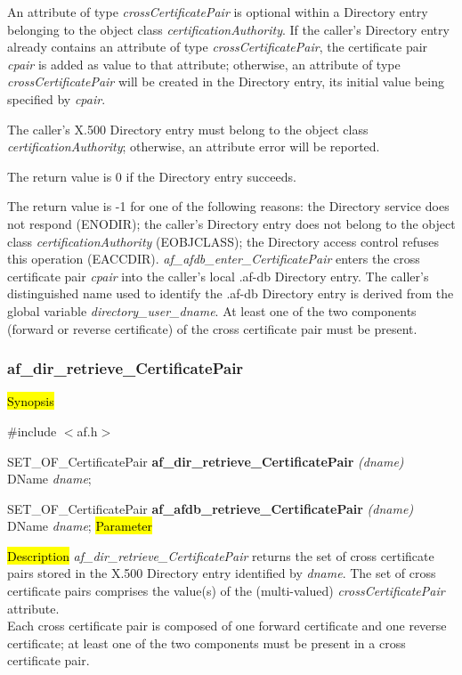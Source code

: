 An attribute of type {\em crossCertificatePair} is optional within a Directory entry
belonging to the object class {\em certificationAuthority}. If the caller's Directory entry
already contains an attribute of
type {\em crossCertificatePair}, the certificate pair {\em cpair} is added as value
to that attribute; otherwise, an attribute of type {\em crossCertificatePair} will be
created in the Directory entry, its initial value being specified by {\em cpair}.

The caller's X.500 Directory entry must belong to the object class
{\em certificationAuthority}; otherwise, an attribute error will be reported.

The return value is 0 if the Directory entry succeeds.

The return value is -1 for one of the following reasons:
\bi
\m the Directory service does not respond (ENODIR);
\m the caller's Directory entry does not belong to the object class
{\em certificationAuthority} (EOBJCLASS);
\m the Directory access control refuses this operation (EACCDIR).
\ei
{\em af\_afdb\_enter\_CertificatePair} enters the cross certificate pair {\em cpair} 
into the caller's local .af-db Directory entry. The caller's distinguished name used to
identify the .af-db Directory entry is derived from
the global variable {\em directory\_user\_dname}. At least one of the two components 
(forward or reverse certificate) of the cross certificate pair must be present.



\subsubsection{af\_dir\_retrieve\_CertificatePair}

\hl{Synopsis}

\#include $<$af.h$>$ 

SET\_OF\_CertificatePair {\bf *af\_dir\_retrieve\_CertificatePair} {\em (dname)} \\
DName {\em *dname};

SET\_OF\_CertificatePair {\bf *af\_afdb\_retrieve\_CertificatePair} {\em (dname)} \\
DName {\em *dname};
\hl{Parameter}

\hl{Description}
{\em af\_dir\_retrieve\_CertificatePair} returns the set of cross certificate pairs 
stored in the X.500 Directory entry identified by {\em dname}. The set of cross certificate pairs 
comprises the value(s) of the (multi-valued) {\em crossCertificatePair} attribute. \\
Each cross certificate pair is composed of one forward certificate and one reverse certificate;
at least one of the two components must be present in a cross certificate pair.

